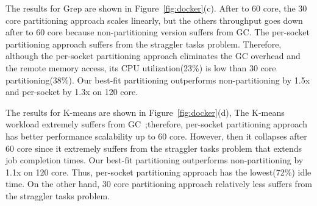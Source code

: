 The results for Grep are shown in Figure~\ref{fig:docker}(c).
After to 60 core, the 30 core partitioning approach scales linearly, but
the others throughput goes down after to 60 core because non-partitioning
version suffers from GC.
The per-socket partitioning approach suffers from the straggler tasks problem.
Therefore, although the per-socket partitioning approach eliminates the GC overhead and
the remote memory access, its CPU utilization(23\%) is low than 30 core partitioning(38\%).
Our best-fit partitioning outperforms non-partitioning by 1.5x and per-socket
by 1.3x on 120 core.


The results for K-means are shown in Figure~\ref{fig:docker}(d),
The K-means workload extremely suffers from GC~\cite{Ahsan2016SVS};therefore,
per-socket partitioning approach has better performance scalability up to 60 core.
However, then it collapses after 60 core since it extremely suffers from the
straggler tasks problem that extends job completion times.
Our best-fit partitioning outperforms non-partitioning by 1.1x on 120 core.
Thus, per-socket partitioning approach has the lowest(72\%) idle time.
On the other hand, 30 core partitioning approach relatively less suffers from the straggler
tasks problem.
